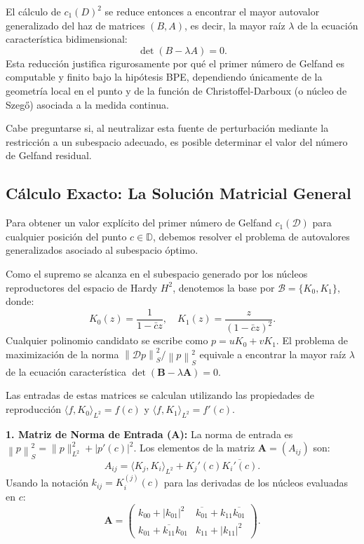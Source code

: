 \documentclass[12pt,a4paper]{article}
\theoremstyle{definition}
\theoremstyle{remark}
\newcommand{\norm}[1]{\left\| #1 \right\|_S}
\newcommand{\abs}[1]{\left| #1 \right|}
\newcommand{\D}{\mathcal{D}}
\begin{document}
El cálculo de $c_1(D)^2$ se reduce entonces a encontrar el mayor autovalor generalizado del haz de matrices $(B, A)$, es decir, la mayor raíz $\lambda$ de la ecuación característica bidimensional:
\begin{equation}
    \det(B - \lambda A) = 0.
\end{equation}
Esta reducción justifica rigurosamente por qué el primer número de Gelfand es computable y finito bajo la hipótesis BPE, dependiendo únicamente de la geometría local en el punto y de la función de Christoffel-Darboux (o núcleo de Szegő) asociada a la medida continua.

Cabe preguntarse si, al neutralizar esta fuente de perturbación mediante la restricción a un subespacio adecuado, es posible determinar el valor del número de Gelfand residual.

\subsection{Cálculo Exacto: La Solución Matricial General}

Para obtener un valor explícito del primer número de Gelfand $c_1(\D)$ para cualquier posición del punto $c \in \mathbb{D}$, debemos resolver el problema de autovalores generalizados asociado al subespacio óptimo.

Como el supremo se alcanza en el subespacio generado por los núcleos reproductores del espacio de Hardy $H^2$, denotemos la base por $\mathcal{B} = \{K_0, K_1\}$, donde:
\begin{equation}
    K_0(z) = \frac{1}{1-\bar{c}z}, \quad K_1(z) = \frac{z}{(1-\bar{c}z)^2}.
\end{equation}
Cualquier polinomio candidato se escribe como $p = u K_0 + v K_1$. El problema de maximización de la norma $\norm{\D p}^2 / \norm{p}^2$ equivale a encontrar la mayor raíz $\lambda$ de la ecuación característica $\det(\mathbf{B} - \lambda \mathbf{A}) = 0$.

Las entradas de estas matrices se calculan utilizando las propiedades de reproducción $\langle f, K_0 \rangle_{L^2} = f(c)$ y $\langle f, K_1 \rangle_{L^2} = f'(c)$.

\textbf{1. Matriz de Norma de Entrada ($\mathbf{A}$):}
La norma de entrada es $\norm{p}^2 = \|p\|_{L^2}^2 + \abs{p'(c)}^2$. Los elementos de la matriz $\mathbf{A} = (A_{ij})$ son:
$$ A_{ij} = \langle K_j, K_i \rangle_{L^2} + K_j'(c)\overline{K_i'(c)}. $$
Usando la notación $k_{ij} = K_i^{(j)}(c)$ para las derivadas de los núcleos evaluadas en $c$:
\begin{equation}
    \mathbf{A} = \begin{pmatrix}
        k_{00} + \abs{k_{01}}^2          & \overline{k_{01}} + k_{11}\overline{k_{01}} \\
        k_{01} + \overline{k_{11}}k_{01} & k_{11} + \abs{k_{11}}^2
    \end{pmatrix}.
\end{equation}
\end{document}
